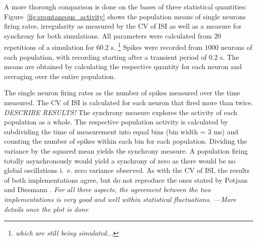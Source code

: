 A more thorough comparison is done on the bases of three statistical quantities: 
Figure~\ref{fig:spontaneous_activity} shows the population means of single neurons firing rates, 
irregularity as measured by  the CV of ISI as well as a measure for synchrony for both 
simulations. All parameters were calculated from $20$ repetitions of a simulation for 
$60.2$ s.%
\footnote{\emph{which are still being simulated...}}
Spikes were recorded from $1000$ neurons of each population, with recording 
starting after a transient period of $0.2$ s. 
The means are obtained by calculating the respective quantity for each neuron and averaging over 
the entire population. 

The single neuron firing rates as 
the number of spikes measured over the time measured.
The CV of ISI is calculated for each neuron that fired more than twice.
\emph{DESCRIBE RESULTS!}
The synchrony measure explores the activity of each population as a whole. The respective population
activity is calculated by subdividing the time of measurement into equal bins (bin width = $3$ ms) 
and counting the number of spikes within each bin for each population. 
Dividing the variance by the squared mean yields the synchrony measure. 
A population firing totally asynchronously would yield a synchrony of zero as there would 
be no global oscillations i.~e. zero variance observed.
As with the CV of ISI, the results of both implementations agree, but do not reproduce the ones stated 
by Potjans and Diesmann \cite{potjans2014}. 
\emph{For all three aspects, the agreement between the two implementations is very good 
and well within statistical fluctuations. ---More details once the plot is done}


